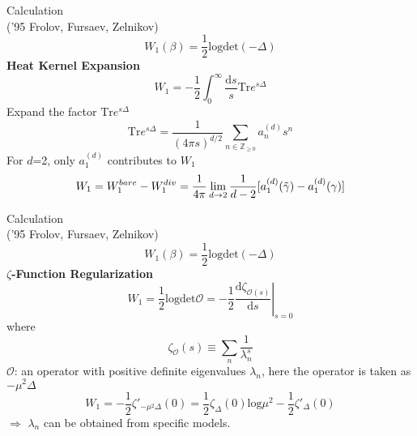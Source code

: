 \documentclass{beamer}
\begin{document}
\begin{frame}{Calculation\\ \normalsize{('95 Frolov, Fursaev, Zelnikov)}}
    \begin{equation*}
        W_1(\beta)=\frac{1}{2}\mathrm{logdet}(-\Delta)
    \end{equation*}
    \textbf{Heat Kernel Expansion}
        \begin{equation*}           W_1=-\frac{1}{2}\int_0^\infty\frac{\mathrm{d}s}{s}\mathrm{Tr}e^{s\Delta}
        \end{equation*}
        Expand the factor $\mathrm{Tr}e^{s\Delta}$
        \begin{equation*}
            \mathrm{Tr}e^{s\Delta}=\frac{1}{(4\pi s)^{d/2}}\sum_{n\in \mathbb{Z}_{\geq0}}a_n^{(d)}s^n
        \end{equation*}
        For $d$=2, only $a_1^{(d)}$ contributes to $W_1$
        \begin{equation*}
            W_1=W_1^{bare}-W_1^{div}=\frac{1}{4\pi}\lim_{d\to2}\frac{1}{d-2}[a_1^{(d)}(\Tilde{\gamma})-a_1^{(d)}(\gamma)]
        \end{equation*}
\end{frame}
\begin{frame}{Calculation\\ \normalsize{('95 Frolov, Fursaev, Zelnikov)}}
    \begin{equation*}
         W_1(\beta)=\frac{1}{2}\mathrm{logdet}(-\Delta)
    \end{equation*}
    \textbf{$\zeta$-Function Regularization}
    \begin{equation*}
        W_1=\frac{1}{2}\mathrm{logdet}\mathcal{O}=-\left.\frac{1}{2}\frac{\mathrm{d}\zeta_{\mathcal{O}(s)}}{\mathrm{d}s}\right|_{s=0}
    \end{equation*}
    where
    \begin{equation*}
        \zeta_{\mathcal{O}}(s)\equiv\sum_n\frac{1}{\lambda_n^s}
    \end{equation*}
    $\mathcal{O}$: an operator with positive definite eigenvalues $\lambda_n$, here the operator is taken as $-\mu^2\Delta$
    \begin{equation*}
        W_1=-\frac{1}{2}\zeta'_{-\mu^2\Delta}(0)=\frac{1}{2}\zeta_\Delta(0)\mathrm{log}\mu^2-\frac{1}{2}\zeta'_\Delta(0)
    \end{equation*}
    $\Rightarrow$ $\lambda_n$ can be obtained from specific models.
\end{frame}
\end{document}
